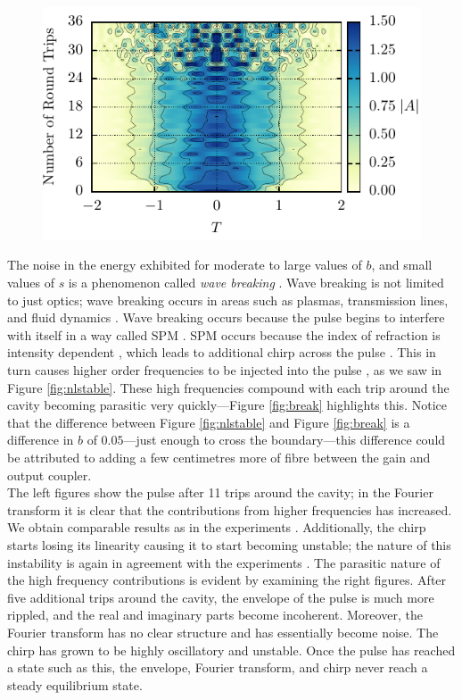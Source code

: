 \documentclass[10pt,twocolumn,a4paper]{article}
\begin{document}
\begin{figure}[htbp]
\centering
\includegraphics{Break}
\caption{}
\label{fig:}
\end{figure}

The noise in the energy exhibited for moderate to large values of $b$, and small values of $s$ is a phenomenon called \emph{wave breaking} \cite{agrawal2013, anderson, finot, rothenberg, tomlinson}. Wave breaking is not limited to just optics; wave breaking occurs in areas such as plasmas, transmission lines, and fluid dynamics \cite{rothenberg}. Wave breaking occurs because the pulse begins to interfere with itself in a way called SPM \cite{agrawal2002, agrawal2013, becker}. SPM occurs because the index of refraction is intensity dependent \cite{agrawal2002, becker, rothenberg, silfvast}, which leads to additional chirp across the pulse \cite{agrawal2013, anderson, rothenberg, silfvast}. This in turn causes higher order frequencies to be injected into the pulse \cite{agrawal2013, anderson}, as we saw in Figure \ref{fig:nlstable}. These high frequencies compound with each trip around the cavity becoming parasitic very quickly---Figure \ref{fig:break} highlights this. Notice that the difference between Figure \ref{fig:nlstable} and Figure \ref{fig:break} is a difference in $b$ of $0.05$---just enough to cross the boundary---this difference could be attributed to adding a few centimetres more of fibre between the gain and output coupler. \\

The left figures show the pulse after 11 trips around the cavity; in the Fourier transform it is clear that the contributions from higher frequencies has increased. We obtain comparable results as in the experiments \cite{anderson, rothenberg}. Additionally, the chirp starts losing its linearity causing it to start becoming unstable; the nature of this instability is again in agreement with the experiments \cite{anderson, rothenberg}. The parasitic nature of the high frequency contributions is evident by examining the right figures. After five additional trips around the cavity, the envelope of the pulse is much more rippled, and the real and imaginary parts become incoherent. Moreover, the Fourier transform has no clear structure and has essentially become noise. The chirp has grown to be highly oscillatory and unstable. Once the pulse has reached a state such as this, the envelope, Fourier transform, and chirp never reach a steady equilibrium state.
\end{document}
